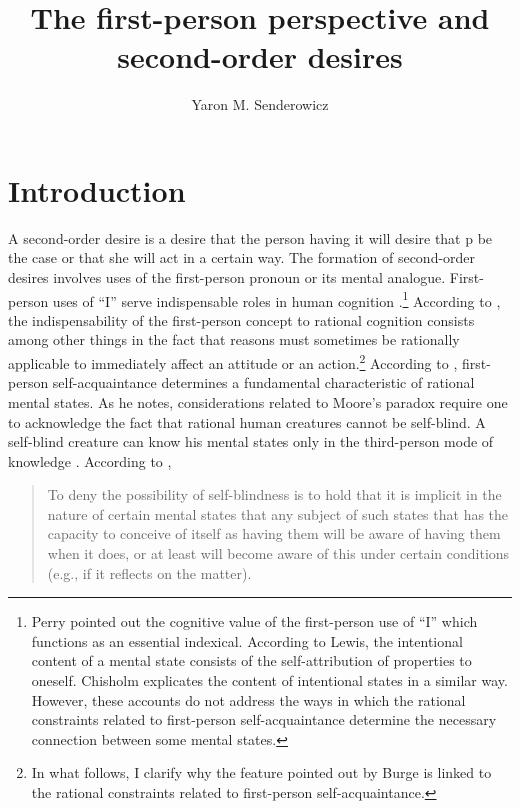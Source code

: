 \documentclass[output=paper]{langscibook}
\author{Yaron M. Senderowicz\orcid{}\affiliation{Tel-Aviv University}}
\title{The first-person perspective and second-order desires}
\begin{document}
\maketitle

\section{Introduction}

A second-order desire is a desire that the person having it will desire that p be the case or that she will act in a certain way. The formation of second-order desires involves uses of the first-person pronoun or its mental analogue. First-person uses of “I” serve indispensable roles in human cognition \citep{castaneda19661999,castaneda1967indicators,castaneda1968logic,perry1979problem,lewis1979attitudes,chisholm1981first}.\footnote{Perry pointed out the cognitive value of the first-person use of “I” which functions as an essential indexical. According to Lewis, the intentional content of a mental state consists of the self-attribution of properties to oneself. Chisholm explicates the content of intentional states in a similar way. However, these accounts do not address the ways in which the rational constraints related to first-person self-acquaintance determine the necessary connection between some mental states.} According to \citet{burge1998reason}, the indispensability of the first-person concept to rational cognition consists among other things in the fact that reasons must sometimes be rationally applicable to immediately affect an attitude or an action.\footnote{In what follows, I clarify why the feature pointed out by Burge is linked to the rational constraints related to first-person self-acquaintance.} According to \citet{shoemaker1996first}, first-person self-acquaintance determines a fundamental characteristic of rational mental states. As he notes, considerations related to Moore's paradox \citep{moore1903refutation} require one to acknowledge the fact that rational human creatures cannot be self-blind. A self-blind creature can know his mental states only in the third-person mode of knowledge \citep[30--31]{shoemaker1996first}. According to \citet[31]{shoemaker1996first},

\begin{quote}
    To deny the possibility of self-blindness is to hold that it is implicit in the nature of certain mental states that any  subject of such states that has the capacity to conceive of  itself as having them will be aware of having them when it does, or at least will become aware of this under certain conditions (e.g., if it reflects on the matter).
\end{quote}
\end{document}
